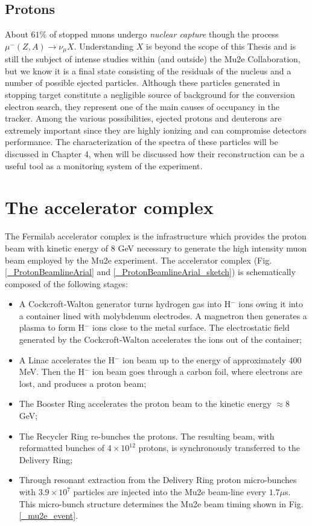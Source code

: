 \documentclass[12pt,a4paper,openright, oneside, titlepage]{book} %
\begin{document}
\subsection{Protons}
\label{backgrounds}
About $61\%$ of stopped muons undergo \textit{nuclear capture} though the process $\mu^-(Z,A)\rightarrow \nu_\mu X$. 
Understanding $X$ is beyond the scope of this Thesis and is still the subject of intense studies within (and outside) the Mu2e Collaboration, but we know it is a final state consisting of the residuals of the nucleus and a number of possible ejected particles. 
Although these particles generated in stopping target constitute a negligible source of background for the conversion electron search, they represent one of the main causes of occupancy in the tracker. 
Among the various possibilities, ejected protons and deuterons are extremely important since they are highly ionizing and can compromise detectors performance. 
The characterization of the spectra of these particles will be discussed in Chapter 4, when will be discussed how their reconstruction can be a useful tool as a monitoring system of the experiment.

\section{The accelerator complex}
\label{sec:beam}
The Fermilab accelerator complex is the infrastructure which provides the proton beam with kinetic energy of 8 GeV necessary to generate the high intensity muon beam employed by the Mu2e experiment.
The accelerator complex (Fig. \ref{_ProtonBeamlineArial} and \ref{_ProtonBeamlineArial_sketch}) is schematically composed of the following stages:
\begin{itemize}
\item A Cockcroft-Walton generator turns hydrogen gas into H$^-$ ions owing it into a container lined with molybdenum electrodes. 
A magnetron then generates a plasma to form H$^-$ ions close to the metal surface. 
The electrostatic field generated by the Cockcroft-Walton accelerates the ions out of the container;
\item A Linac accelerates the H$^-$ ion beam up to the energy of approximately 400 MeV. 
Then the H$^-$  ion beam goes through a carbon foil, where electrons are lost, and produces a proton beam;
\item The Booster Ring accelerates the proton beam to the kinetic energy $\approx8$ GeV;
\item The Recycler Ring re-bunches the protons. 
The resulting beam, with reformatted bunches of $4\times10^{12}$ protons, is synchronously transferred to the Delivery Ring;
\item Through resonant extraction from the Delivery Ring proton micro-bunches with $3.9\times10^7$ particles are injected into the Mu2e beam-line every $1.7 \mu$s. 
This  micro-bunch structure determines the Mu2e beam timing shown in Fig.  \ref{_mu2e_event}. 
\end{itemize}
\end{document}
